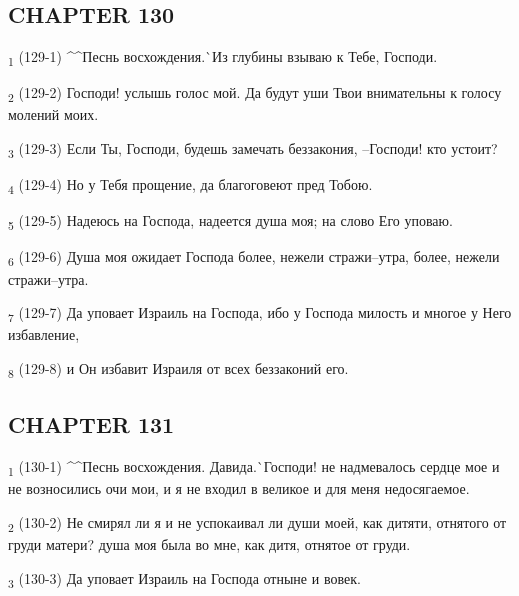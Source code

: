 \subsection{CHAPTER 130}
\begin{tcolorbox}
\textsubscript{1} (129-1) ^^Песнь восхождения.^^ Из глубины взываю к Тебе, Господи.
\end{tcolorbox}
\begin{tcolorbox}
\textsubscript{2} (129-2) Господи! услышь голос мой. Да будут уши Твои внимательны к голосу молений моих.
\end{tcolorbox}
\begin{tcolorbox}
\textsubscript{3} (129-3) Если Ты, Господи, будешь замечать беззакония, --Господи! кто устоит?
\end{tcolorbox}
\begin{tcolorbox}
\textsubscript{4} (129-4) Но у Тебя прощение, да благоговеют пред Тобою.
\end{tcolorbox}
\begin{tcolorbox}
\textsubscript{5} (129-5) Надеюсь на Господа, надеется душа моя; на слово Его уповаю.
\end{tcolorbox}
\begin{tcolorbox}
\textsubscript{6} (129-6) Душа моя ожидает Господа более, нежели стражи--утра, более, нежели стражи--утра.
\end{tcolorbox}
\begin{tcolorbox}
\textsubscript{7} (129-7) Да уповает Израиль на Господа, ибо у Господа милость и многое у Него избавление,
\end{tcolorbox}
\begin{tcolorbox}
\textsubscript{8} (129-8) и Он избавит Израиля от всех беззаконий его.
\end{tcolorbox}
\subsection{CHAPTER 131}
\begin{tcolorbox}
\textsubscript{1} (130-1) ^^Песнь восхождения. Давида.^^ Господи! не надмевалось сердце мое и не возносились очи мои, и я не входил в великое и для меня недосягаемое.
\end{tcolorbox}
\begin{tcolorbox}
\textsubscript{2} (130-2) Не смирял ли я и не успокаивал ли души моей, как дитяти, отнятого от груди матери? душа моя была во мне, как дитя, отнятое от груди.
\end{tcolorbox}
\begin{tcolorbox}
\textsubscript{3} (130-3) Да уповает Израиль на Господа отныне и вовек.
\end{tcolorbox}
